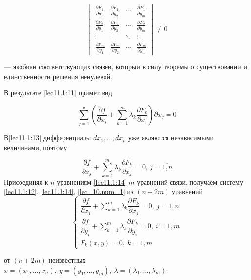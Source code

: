 \documentclass[../../main.tex]{subfiles}
\begin{document}
	\[
	\begin{vmatrix}
	\frac{\partial F_1}{\partial y_1} & \frac{\partial F_1}{\partial y_2}
	& \cdots & \frac{\partial F_1}{\partial y_m} \\
	\frac{\partial F_2}{\partial y_1} & \frac{\partial F_2}{\partial y_2} 
	& \cdots & \frac{\partial F_2}{\partial y_m} \\
	\vdots  & \vdots  & \ddots & \vdots  \\
	\frac{\partial F_m}{\partial y_1} & \frac{\partial F_m}{\partial y_2}
	& \cdots & \frac{\partial F_m}{\partial y_m}
	\end{vmatrix} \ne 0
	\]
	
    --- якобиан соответствующих связей, который в силу теоремы о существовании
	и единственности решения ненулевой.
	
	В результате \eqref{lec11.1:11} примет вид
	
	\begin{equation}
	\label{lec11.1:13}
	\sum\limits_{j=1}^{n}\left(  \dfrac{\partial f }{\partial x_j} + 
	\sum\limits_{k=1}^{m} \lambda_k\dfrac{\partial F_k }{\partial x_j}  
	\right) \partial x_j =0 
	\end{equation}
	
	В\eqref{lec11.1:13} дифференциалы
	$d x_1,\ldots,d x_n$ уже являются независимыми величинами, поэтому
	
	\begin{equation}
	\label{lec11.1:14}
	\dfrac{\partial f }{\partial x_j} + \sum\limits_{k=1}^{m}
	\lambda_k \dfrac{\partial F_k }{\partial x_j} = 0,\ j = \overline{1, n}
	\end{equation}
	Присоединяя к $n$ уравнениям \eqref{lec11.1:14} $m$
	уравнений связи, получаем систему
	\eqref{lec11.1:12},
	\eqref{lec11.1:14},
	\eqref{lec_10.num_1}
	из $ \left( n + 2m \right) $ уравнений
	\[
	\begin{cases}
	\dfrac{\partial f }{\partial x_j} + \sum\limits_{k=1}^{m}
	\lambda_k \dfrac{\partial F_k }{\partial x_j} = 0,\ j = \overline{1, n}\\
	\dfrac{\partial f}{\partial y_i} + \sum\limits_{k = 1}^m \lambda_k 
	\dfrac{\partial F_k}{\partial y_i} = 0,\ i = \overline{1,m} \\
	F_k\left( x, y \right) = 0,\; k = \overline{1, m}
	\end{cases}
	\]
	
	от $ \left( n + 2m \right) $ неизвестных $x = \left( 
	x_1, \ldots, x_n \right),\ 
	y = \left( y_1, \ldots, y_m \right),\ \lambda = \left( \lambda_1,
	\ldots, \lambda_m \right) $.
	
\end{document}
